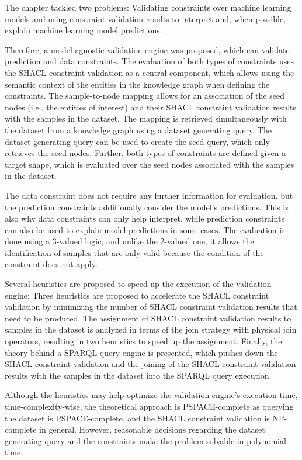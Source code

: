 The chapter tackled two problems: Validating constraints over machine learning models and using constraint validation results to interpret and, when possible, explain machine learning model predictions. 

Therefore, a model-agnostic validation engine was proposed, which can validate prediction and data constraints. The evaluation of both types of constraints uses the SHACL constraint validation as a central component, which allows using the semantic context of the entities in the knowledge graph when defining the constraints. The sample-to-node mapping allows for an association of the seed nodes (i.e., the entities of interest) and their SHACL constraint validation results with the samples in the dataset. The mapping is retrieved simultaneously with the dataset from a knowledge graph using a dataset generating query. The dataset generating query can be used to create the seed query, which only retrieves the seed nodes. Further, both types of constraints are defined given a target shape, which is evaluated over the seed nodes associated with the samples in the dataset.

The data constraint does not require any further information for evaluation, but the prediction constraints additionally consider the model's predictions. This is also why data constraints can only help interpret, while prediction constraints can also be used to explain model predictions in some cases. The evaluation is done using a 3-valued logic, and unlike the 2-valued one, it allows the identification of samples that are only valid because the condition of the constraint does not apply.

Several heuristics are proposed to speed up the execution of the validation engine: Three heuristics are proposed to accelerate the SHACL constraint validation by minimizing the number of SHACL constraint validation results that need to be produced. The assignment of SHACL constraint validation results to samples in the dataset is analyzed in terms of the join strategy with physical join operators, resulting in two heuristics to speed up the assignment. Finally, the theory behind a SPARQL query engine is presented, which pushes down the SHACL constraint validation and the joining of the SHACL constraint validation results with the samples in the dataset into the SPARQL query execution.

Although the heuristics may help optimize the validation engine's execution time, time-complexity-wise, the theoretical approach is PSPACE-complete as querying the dataset is PSPACE-complete, and the SHACL constraint validation is NP-complete in general. However, reasonable decisions regarding the dataset generating query and the constraints make the problem solvable in polynomial time. 

